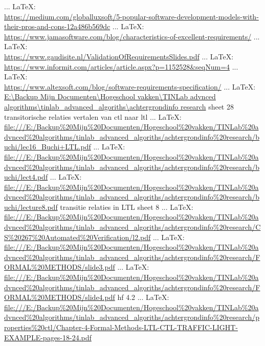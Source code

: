 \begin{thebibliography}{99}
{{ ... \LaTeX:\\ \url{https://medium.com/globalluxsoft/5-popular-software-development-models-with-their-pros-and-cons-12a486b569dc}
 ... \LaTeX:\\ \url{https://www.jamasoftware.com/blog/characteristics-of-excellent-requirements/}
 ... \LaTeX:\\ \url{https://www.gaudisite.nl/ValidationOfRequirementsSlides.pdf}
 ... \LaTeX:\\ \url{https://www.informit.com/articles/article.aspx?p=1152528&seqNum=4}
 ... \LaTeX:\\ \url{https://www.altexsoft.com/blog/software-requirements-specification/}
 ... \LaTeX:\\ \url{E:\Backup Mijn Documenten\Hogeschool vakken\TINLab advnced algorithms\tinlab_advanced_algoriths\achtergrondinfo research}
sheet 28 transitorische relaties vertalen van ctl naar ltl
 ... \LaTeX:\\ \url{file:///E:/Backup%20Mijn%20Documenten/Hogeschool%20vakken/TINLab%20advnced%20algorithms/tinlab_advanced_algoriths/achtergrondinfo%20research/buchi/lec16_Buchi+LTL.pdf}
 ... \LaTeX:\\ \url{file:///E:/Backup%20Mijn%20Documenten/Hogeschool%20vakken/TINLab%20advnced%20algorithms/tinlab_advanced_algoriths/achtergrondinfo%20research/buchi/lect4.pdf}
 ... \LaTeX:\\ \url{file:///E:/Backup%20Mijn%20Documenten/Hogeschool%20vakken/TINLab%20advnced%20algorithms/tinlab_advanced_algoriths/achtergrondinfo%20research/buchi/lecture8.pdf}
transitie relaties in LTL sheet 8
 ... \LaTeX:\\ \url{file:///E:/Backup%20Mijn%20Documenten/Hogeschool%20vakken/TINLab%20advnced%20algorithms/tinlab_advanced_algoriths/achtergrondinfo%20research/CS%20267%20Automated%20Verification/l2.pdf}
 ... \LaTeX:\\ \url{file:///E:/Backup%20Mijn%20Documenten/Hogeschool%20vakken/TINLab%20advnced%20algorithms/tinlab_advanced_algoriths/achtergrondinfo%20research/FORMAL%20METHODS/slide3.pdf}
 ... \LaTeX:\\ \url{file:///E:/Backup%20Mijn%20Documenten/Hogeschool%20vakken/TINLab%20advnced%20algorithms/tinlab_advanced_algoriths/achtergrondinfo%20research/FORMAL%20METHODS/slide4.pdf}
hf 4.2
 ... \LaTeX:\\ \url{file:///E:/Backup%20Mijn%20Documenten/Hogeschool%20vakken/TINLab%20advnced%20algorithms/tinlab_advanced_algoriths/achtergrondinfo%20research/properties%20ctl/Chapter-4-Formal-Methods-LTL-CTL-TRAFFIC-LIGHT-EXAMPLE-pages-18-24.pdf}


}}
\end{thebibliography}
